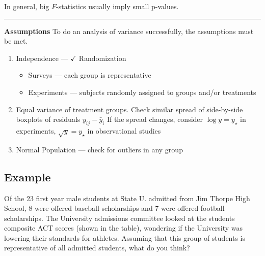 \documentclass[
]{article}
\providecommand{\tightlist}{%
  \setlength{\itemsep}{0pt}\setlength{\parskip}{0pt}}
\begin{document}
In general, big \(F\)-statistics usually imply small p-values.

\begin{center}\rule{0.5\linewidth}{0.5pt}\end{center}

\textbf{Assumptions} To do an analysis of variance successfully, the assumptions must be met.

\begin{enumerate}
\def\labelenumi{\arabic{enumi}.}
\item
  Independence --- \(\checkmark\) Randomization

  \begin{itemize}
  \tightlist
  \item
    Surveys --- each group is representative
  \item
    Experiments --- subjects randomly assigned to groups and/or treatments
  \end{itemize}
\item
  Equal variance of treatment groups. Check similar spread of side-by-side boxplots of residuals \(y_{ij} - \bar{y}_i\) If the spread changes, consider \(\log y = y_{\star}\) in experiments, \(\sqrt{y}=y_{\star}\) in observational studies
\item
  Normal Population --- check for outliers in any group
\end{enumerate}

\hypertarget{example}{%
\subsection*{Example}\label{example}}

Of the 23 first year male students at State U. admitted from Jim Thorpe High School, 8 were offered baseball scholarships and 7 were offered football scholarships. The University admissions committee looked at the students composite ACT scores (shown in the table), wondering if the University was lowering their standards for athletes. Assuming that this group of students is representative of all admitted students, what do you think?
\end{document}
